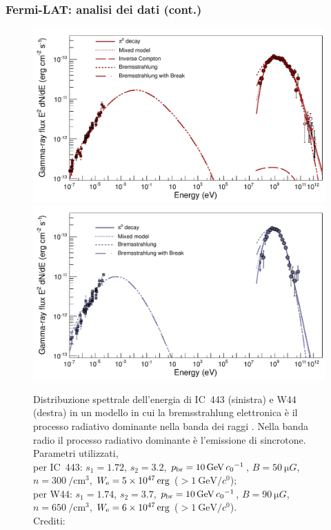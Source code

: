 \documentclass[10pt]{beamer}
\begin{document}
\begin{frame}
  \frametitle{Fermi-LAT: analisi dei dati (cont.)}
  \begin{figure}
    \centering
    \includegraphics[width=0.5\columnwidth]{1231160figS2}
    \includegraphics[width=0.5\columnwidth]{1231160figS3}
    \caption{Distribuzione spettrale dell'energia di IC~443 (sinistra) e W44
      (destra) in un modello in cui la bremsstrahlung elettronica è il processo
      radiativo dominante nella banda dei raggi \PGg.  Nella banda radio il
      processo radiativo dominante è l'emissione di sincrotone.  Parametri
      utilizzati, \\
      per IC~443: $s_{1} = 1.72$, $s_{2} = 3.2$,
      $p_{\textup{br}} = \SI{10}{\giga\electronvolt\per\clight}$,
      $B = \SI{50}{\micro G}$, $n = \SI{300}{\per\centi\metre\cubed}$,
      $W_{\textup{e}} = \SI{5e47}{erg}$
      ($> \SI{1}{\giga\electronvolt\per\clight}$);  \\
      per W44: $s_{1} = 1.74$, $s_{2} = 3.7$,
      $p_{\textup{br}} = \SI{10}{\giga\electronvolt\per\clight}$,
      $B = \SI{90}{\micro G}$, $n = \SI{650}{\per\centi\metre\cubed}$,
      $W_{\textup{e}} = \SI{6e47}{erg}$
      ($> \SI{1}{\giga\electronvolt\per\clight}$). \\
      Crediti: \textcite{2013Sci...339..807A}}
  \end{figure}
\end{frame}
\end{document}
